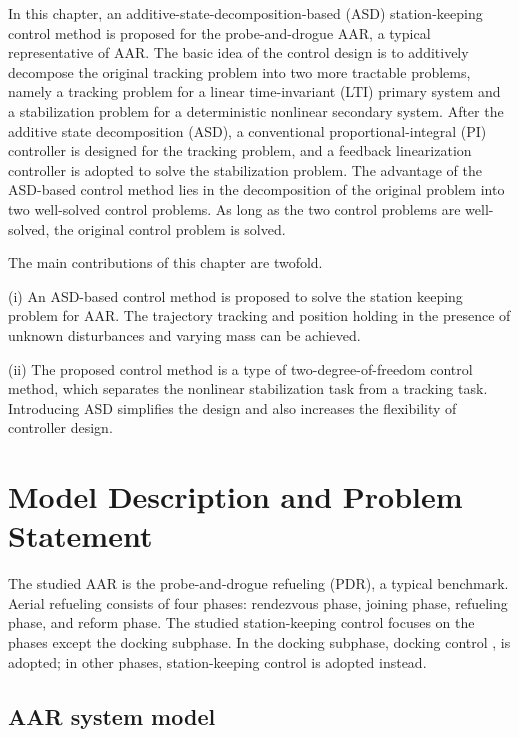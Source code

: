 In this chapter, an additive-state-decomposition-based (ASD) \cite%
{quan2015additive} station-keeping control method is proposed for the
probe-and-drogue AAR, a typical representative of AAR. The basic idea of the
control design is to additively decompose the original tracking problem into
two more tractable problems, namely a tracking problem for a linear
time-invariant (LTI) primary system and a stabilization problem for a
deterministic nonlinear secondary system. After the additive state
decomposition (ASD), a conventional proportional-integral (PI) controller is
designed for the tracking problem, and a feedback linearization controller
is adopted to solve the stabilization problem. The advantage of the
ASD-based control method lies in the decomposition of the original problem
into two well-solved control problems. As long as the two control problems
are well-solved, the original control problem is solved.

The main contributions of this chapter are twofold.

(i) An ASD-based control method is proposed to solve the station keeping
problem for AAR. The trajectory tracking and position holding in the
presence of unknown disturbances and varying mass can be achieved.

(ii) The proposed control method is a type of two-degree-of-freedom control
method, which separates the nonlinear stabilization task from a tracking
task. Introducing ASD simplifies the design and also increases the flexibility of controller design.

\section{Model Description and Problem Statement}

\label{Model}

The studied AAR is the probe-and-drogue refueling (PDR), a typical
benchmark. Aerial refueling
consists of four phases: rendezvous phase, joining phase, refueling phase,
and reform phase. The studied station-keeping control focuses on the phases except the docking
subphase. In the docking subphase, docking control \cite{su2015autonomous},
\cite{ren2019reliable} is adopted; in other phases,
station-keeping control is adopted instead.

\subsection{AAR system model}

